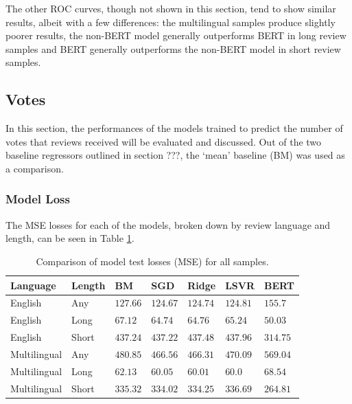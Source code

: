 The other ROC curves, though not shown in this section, tend to show similar results, albeit with a few differences: the multilingual samples produce slightly poorer results, the non-BERT model generally outperforms BERT in long review samples and BERT generally outperforms the non-BERT model in short review samples.

\subsection{Votes} \label{sec:Res_RF_Votes}

In this section, the performances of the models trained to predict the number of votes that reviews received will be evaluated and discussed. Out of the two baseline regressors outlined in section ???, the `mean' baseline (BM) was used as a comparison.

\subsubsection{Model Loss}

The MSE losses for each of the models, broken down by review language and length, can be seen in Table \ref{tab:Res_RF_Votes_CompLoss}.

\begin{table}[ht]
    \centering
    \begin{tabular}{l l | l l l l l}
        \toprule
        \textbf{Language} & \textbf{Length} & \textbf{BM} & \textbf{SGD} & \textbf{Ridge} & \textbf{LSVR} & \textbf{BERT}\\\midrule
        English&Any&$127.66$&$\mathbf{124.67}$&$124.74$&$124.81$&$155.7$\\
        English&Long&$67.12$&$64.74$&$64.76$&$65.24$&$\mathbf{50.03}$\\
        English&Short&$437.24$&$437.22$&$437.48$&$437.96$&$\mathbf{314.75}$\\\midrule
        Multilingual&Any&$480.85$&$466.56$&$\mathbf{466.31}$&$470.09$&$569.04$\\
        Multilingual&Long&$62.13$&$60.05$&$60.01$&$\mathbf{60.0}$&$68.54$\\
        Multilingual&Short&$335.32$&$334.02$&$334.25$&$336.69$&$\mathbf{264.81}$\\
        \bottomrule
    \end{tabular}
    \caption{Comparison of model test losses (MSE) for all samples.}
    \label{tab:Res_RF_Votes_CompLoss}
\end{table}

